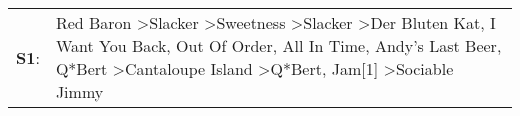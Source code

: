 \begin{supertabular}{p{0.03\textwidth}p{0.92\textwidth}}
 \textbf{S1}:  &  Red Baron\textsuperscript{} \textgreater \enspace Slacker\textsuperscript{} \textgreater \enspace Sweetness\textsuperscript{} \textgreater \enspace Slacker\textsuperscript{} \textgreater \enspace Der Bluten Kat\textsuperscript{}, \enspace I Want You Back\textsuperscript{}, \enspace Out Of Order\textsuperscript{}, \enspace All In Time\textsuperscript{}, \enspace Andy's Last Beer\textsuperscript{}, \enspace Q*Bert\textsuperscript{} \textgreater \enspace Cantaloupe Island\textsuperscript{} \textgreater \enspace Q*Bert\textsuperscript{}, \enspace Jam[1]\textsuperscript{} \textgreater \enspace Sociable Jimmy\textsuperscript{}  \enspace  \\
\end{supertabular}
